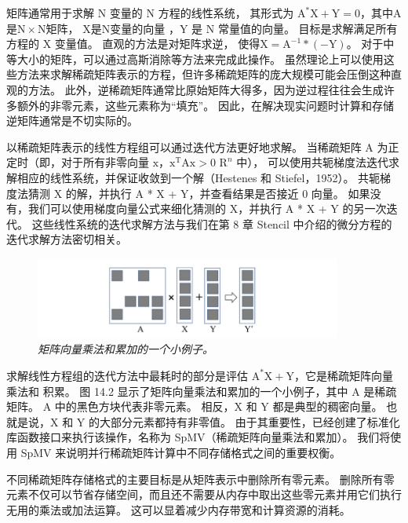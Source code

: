 矩阵通常用于求解 $\mathrm{N}$ 变量的 $\mathrm{N}$ 方程的线性系统，
其形式为 $\mathrm{A}^{*} \mathrm{X}+\mathrm{Y }=0$，其中$\mathrm{A}$是$\mathrm{N} \times \mathrm{N}$矩阵，
$\mathrm{X}$是$\mathrm{N}$变量的向量 ，$\mathrm{Y}$ 是 $\mathrm{N}$ 常量值的向量。 
目标是求解满足所有方程的 $\mathrm{X}$ 变量值。 直观的方法是对矩阵求逆，
使得$\mathrm{X}=\mathrm{A}^{-1} *(-\mathrm{Y})$。 对于中等大小的矩阵，可以通过高斯消除等方法来完成此操作。 
虽然理论上可以使用这些方法来求解稀疏矩阵表示的方程，但许多稀疏矩阵的庞大规模可能会压倒这种直观的方法。 
此外，逆稀疏矩阵通常比原始矩阵大得多，因为逆过程往往会生成许多额外的非零元素，这些元素称为“填充”。 
因此，在解决现实问题时计算和存储逆矩阵通常是不切实际的。

以稀疏矩阵表示的线性方程组可以通过迭代方法更好地求解。 
当稀疏矩阵 $\mathrm{A}$ 为正定时（即，对于所有非零向量 
$\mathrm{x}$，$\mathrm{x}^{\mathrm{T}} \mathrm{Ax}>0$ $\mathrm{R}^{n}$ 中），
可以使用共轭梯度法迭代求解相应的线性系统，并保证收敛到一个解（Hestenes 和 Stiefel，1952）。 
共轭梯度法猜测 X 的解，并执行 A * X + Y，并查看结果是否接近 0 向量。 
如果没有，我们可以使用梯度向量公式来细化猜测的 X，并执行 A * X + Y 的另一次迭代。
这些线性系统的迭代求解方法与我们在第 8 章 Stencil 中介绍的微分方程的迭代求解方法密切相关。

\begin{figure}[H]
	\centering
	\includegraphics[width=0.9\textwidth]{figs/F14.2.png}
	\caption{\textit{矩阵向量乘法和累加的一个小例子。}}
\end{figure}

求解线性方程组的迭代方法中最耗时的部分是评估 $\mathrm{A}^{*} \mathrm{X}+\mathrm{Y}$，它是稀疏矩阵向量乘法和 积累。 
图 14.2 显示了矩阵向量乘法和累加的一个小例子，其中 A 是稀疏矩阵。 
$\mathrm{A}$ 中的黑色方块代表非零元素。 相反，$\mathrm{X}$ 和 $\mathrm{Y}$ 都是典型的稠密向量。 
也就是说，$\mathrm{X}$ 和 $\mathrm{Y}$ 的大部分元素都持有非零值。 
由于其重要性，已经创建了标准化库函数接口来执行该操作，名称为 SpMV（稀疏矩阵向量乘法和累加）。 
我们将使用 SpMV 来说明并行稀疏矩阵计算中不同存储格式之间的重要权衡。

不同稀疏矩阵存储格式的主要目标是从矩阵表示中删除所有零元素。 
删除所有零元素不仅可以节省存储空间，而且还不需要从内存中取出这些零元素并用它们执行无用的乘法或加法运算。 
这可以显着减少内存带宽和计算资源的消耗。

